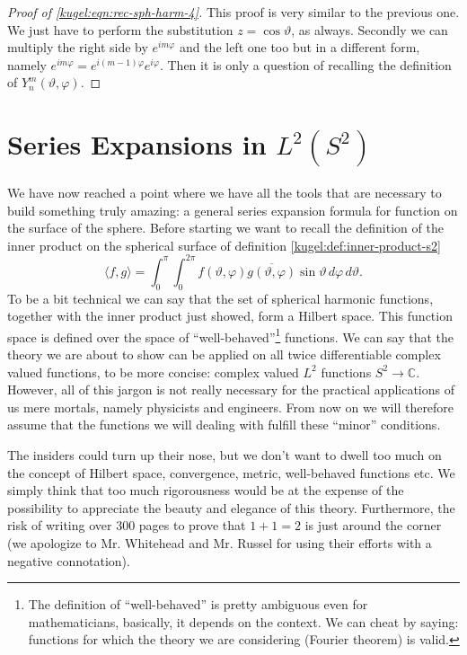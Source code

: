 \begin{proof}[Proof of \eqref{kugel:eqn:rec-sph-harm-4}]
  This proof is very similar to the previous one. We just have to perform the
  substitution $z = \cos \vartheta$, as always. Secondly we can multiply the
  right side by $e^{im\varphi}$ and the left one too but in a different form,
  namely $e^{im\varphi}=e^{i(m-1)\varphi}e^{i\varphi}$. Then it is only a
  question of recalling the definition of $Y^m_n(\vartheta, \varphi)$.
\end{proof}

\section{Series Expansions in $L^2(S^2)$}
\label{kugel:sec:expansion}

We have now reached a point where we have all the tools that are necessary to
build something truly amazing: a general series expansion formula for function
on the surface of the sphere.  Before starting we want to recall the definition
of the inner product on the spherical surface of definition
\ref{kugel:def:inner-product-s2}
\begin{equation*}
  \langle f, g \rangle
  = \int_{0}^\pi \int_0^{2\pi}
    f(\vartheta, \varphi) \overline{g(\vartheta, \varphi)}
    \sin \vartheta \, d\varphi \, d\vartheta.
\end{equation*}
To be a bit technical we can say that the set of spherical harmonic functions,
together with the inner product just showed, form a Hilbert space. This function
space is defined over the space of ``well-behaved''\footnote{The definition of
``well-behaved'' is pretty ambiguous even for mathematicians, basically, it
depends on the context. We can cheat by saying: functions for which the theory
we are considering (Fourier theorem) is valid.} functions.  We can say that the
theory we are about to show can be applied on all twice differentiable complex
valued functions, to be more concise: complex valued $L^2$ functions $S^2 \to
\mathbb{C}$. However, all of this jargon is not really necessary for the
practical applications of us mere mortals, namely physicists and engineers.
From now on we will therefore assume that the functions we will dealing with
fulfill these ``minor'' conditions.

The insiders could turn up their nose, but we don't want to dwell too much on
the concept of Hilbert space, convergence, metric, well-behaved functions etc.
We simply think that too much rigorousness would be at the expense of the
possibility to appreciate the beauty and elegance of this theory.  Furthermore,
the risk of writing over 300 pages to prove that $1+1=2$ is just around the
corner (we apologize to Mr. Whitehead and Mr. Russel for using their efforts
\cite{principia-mathematica} with a negative connotation).

